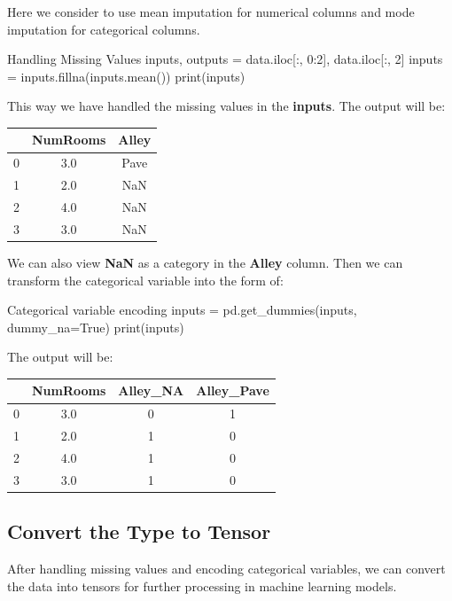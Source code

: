 Here we consider to use mean imputation for numerical columns and mode imputation for categorical columns.

\begin{pythoncode}{Handling Missing Values}
inputs, outputs = data.iloc[:, 0:2], data.iloc[:, 2]
inputs = inputs.fillna(inputs.mean())
print(inputs)
\end{pythoncode}

This way we have handled the missing values in the \textbf{inputs}. The output will be:

\begin{center}
    \begin{tabular}{ccc}
    \hline
    & NumRooms & Alley \\
    \hline
    0 & 3.0 & Pave \\
    1 & 2.0 & NaN \\
    2 & 4.0 & NaN \\
    3 & 3.0 & NaN \\
    \hline
    \end{tabular}
\end{center}

We can also view \textbf{NaN} as a category in the \textbf{Alley} column. Then we can transform the categorical variable into the form of:

\begin{pythoncode}{Categorical variable encoding}
inputs = pd.get_dummies(inputs, dummy_na=True)
print(inputs)
\end{pythoncode}

The output will be:
\begin{center}
    \begin{tabular}{cccc}
    \hline
    & NumRooms & Alley\_NA & Alley\_Pave \\
    \hline
    0 & 3.0 & 0 & 1 \\
    1 & 2.0 & 1 & 0 \\
    2 & 4.0 & 1 & 0 \\
    3 & 3.0 & 1 & 0 \\
    \hline
    \end{tabular}
\end{center}

\subsection{Convert the Type to Tensor}

After handling missing values and encoding categorical variables, we can convert the data into tensors for further processing in machine learning models.

